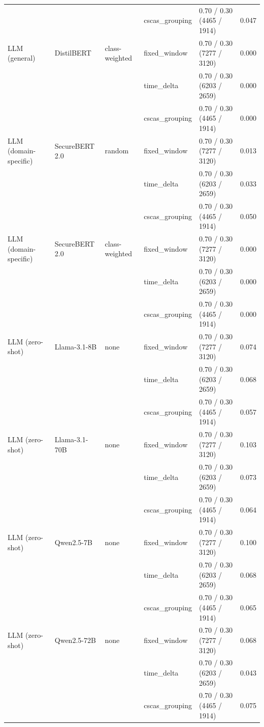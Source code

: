 \begin{table}[htbp]
{\begin{tabular}{lllllc}
 &  &  & cscas\_grouping & 0.70 / 0.30 (4465 / 1914) & 0.047 \\
\addlinespace
LLM (general) & DistilBERT & class-weighted & fixed\_window & 0.70 / 0.30 (7277 / 3120) & 0.000 \\
 &  &  & time\_delta & 0.70 / 0.30 (6203 / 2659) & 0.000 \\
 &  &  & cscas\_grouping & 0.70 / 0.30 (4465 / 1914) & 0.000 \\
\addlinespace
LLM (domain-specific) & SecureBERT 2.0 & random & fixed\_window & 0.70 / 0.30 (7277 / 3120) & 0.013 \\
 &  &  & time\_delta & 0.70 / 0.30 (6203 / 2659) & 0.033 \\
 &  &  & cscas\_grouping & 0.70 / 0.30 (4465 / 1914) & 0.050 \\
\addlinespace
LLM (domain-specific) & SecureBERT 2.0 & class-weighted & fixed\_window & 0.70 / 0.30 (7277 / 3120) & 0.000 \\
 &  &  & time\_delta & 0.70 / 0.30 (6203 / 2659) & 0.000 \\
 &  &  & cscas\_grouping & 0.70 / 0.30 (4465 / 1914) & 0.000 \\
\addlinespace
LLM (zero-shot) & Llama-3.1-8B & none & fixed\_window & 0.70 / 0.30 (7277 / 3120) & 0.074 \\
 &  &  & time\_delta & 0.70 / 0.30 (6203 / 2659) & 0.068 \\
 &  &  & cscas\_grouping & 0.70 / 0.30 (4465 / 1914) & 0.057 \\
\addlinespace
LLM (zero-shot) & Llama-3.1-70B & none & fixed\_window & 0.70 / 0.30 (7277 / 3120) & 0.103 \\
 &  &  & time\_delta & 0.70 / 0.30 (6203 / 2659) & 0.073 \\
 &  &  & cscas\_grouping & 0.70 / 0.30 (4465 / 1914) & 0.064 \\
\addlinespace
LLM (zero-shot) & Qwen2.5-7B & none & fixed\_window & 0.70 / 0.30 (7277 / 3120) & 0.100 \\
 &  &  & time\_delta & 0.70 / 0.30 (6203 / 2659) & 0.068 \\
 &  &  & cscas\_grouping & 0.70 / 0.30 (4465 / 1914) & 0.065 \\
\addlinespace
LLM (zero-shot) & Qwen2.5-72B & none & fixed\_window & 0.70 / 0.30 (7277 / 3120) & 0.068 \\
 &  &  & time\_delta & 0.70 / 0.30 (6203 / 2659) & 0.043 \\
 &  &  & cscas\_grouping & 0.70 / 0.30 (4465 / 1914) & 0.075 \\
\midrule

\end{tabular}}
\end{table}
